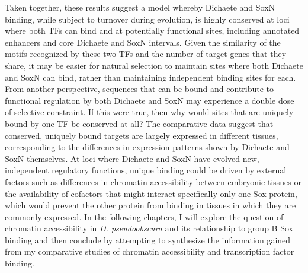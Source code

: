 Taken together, these results suggest a model whereby Dichaete and SoxN binding, while subject to turnover during evolution, is highly conserved at loci where both TFs can bind and at potentially functional sites, including annotated enhancers and core Dichaete and SoxN intervals. Given the similarity of the motifs recognized by these two TFs and the number of target genes that they share, it may be easier for natural selection to maintain sites where both Dichaete and SoxN can bind, rather than maintaining independent binding sites for each. From another perspective, sequences that can be bound and contribute to functional regulation by both Dichaete and SoxN may experience a double dose of selective constraint. If this were true, then why would sites that are uniquely bound by one TF be conserved at all? The comparative data suggest that conserved, uniquely bound targets are largely expressed in different tissues, corresponding to the differences in expression patterns shown by Dichaete and SoxN themselves. At loci where Dichaete and SoxN have evolved new, independent regulatory functions, unique binding could be driven by external factors such as differences in chromatin accessibility between embryonic tissues or the availability of cofactors that might interact specifically only one Sox protein, which would prevent the other protein from binding in tissues in which they are commonly expressed. In the following chapters, I will explore the question of chromatin accessibility in \emph{D. pseudoobscura} and its relationship to group B Sox binding and then conclude by attempting to synthesize the information gained from my comparative studies of chromatin accessibility and transcription factor binding.  
